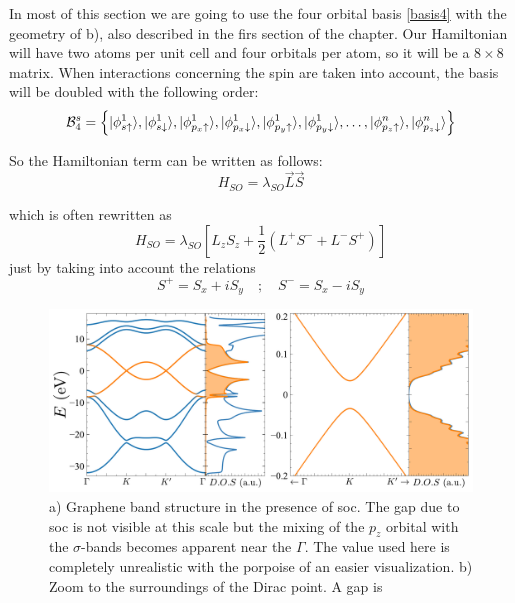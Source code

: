In most of this section we are going to use the four orbital basis \eqref{basis4} with the geometry of b), also described in the firs section of the chapter. Our Hamiltonian will have two atoms per unit cell and four orbitals per atom, so it will be a $8\times8$ matrix. When interactions concerning the spin are taken into account, the basis will be doubled with the following order:
\begin{equation}
  \mathcal{B}^{s}_4 = \left\{
  |\phi^1_{s\uparrow}\rangle,
  |\phi^1_{s\downarrow}\rangle,
  |\phi^1_{p_x\uparrow}\rangle,
  |\phi^1_{p_x\downarrow}\rangle,
  |\phi^1_{p_y\uparrow}\rangle,
  |\phi^1_{p_y\downarrow}\rangle,
  \dots,
  |\phi^n_{p_z\uparrow}\rangle,
  |\phi^n_{p_z\downarrow}\rangle
  \right\}
\label{basis4spin}
\end{equation}

So the Hamiltonian term can be written as follows:
\begin{equation}
   H_{SO}= \lambda_{SO}\vec{L}\vec{S}
\label{soc}
\end{equation}

which is often rewritten as
\begin{equation}
   H_{SO} = \lambda_{SO}\left[L_zS_z+
   \frac{1}{2}\left(L^{+}S^{-}+L^{-}S^{+}\right)\right]
\end{equation}
just by taking into account the relations
\begin{equation*}
   S^{+} = S_x + iS_y \quad;\quad
   S^{-} = S_x - iS_y
\end{equation*}

\begin{figure}[h!]
\centering
\includegraphics{graphene/figures/banddos_SOC.pdf}
\vspace{-5pt}
\caption{a) Graphene band structure in the presence of \ac{soc}. The gap due to \ac{soc} is not visible at this scale but the mixing of the $p_z$ orbital with the $\sigma$-bands becomes apparent near the $\Gamma$. The value used here is completely unrealistic with the porpoise of an easier visualization. b) Zoom to the surroundings of the Dirac point. A gap is }
\label{fig:SOC}
\end{figure}
\FloatBarrier

